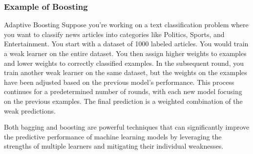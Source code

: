\documentclass[12pt]{article}
\begin{document}
\subsubsection{Example of Boosting}
Adaptive Boosting
Suppose you're working on a text classification problem where you want to classify news articles into categories like Politics, Sports, and Entertainment. You start with a dataset of 1000 labeled articles. You would train a weak learner on the entire dataset. You then assign higher weights to examples and lower weights to correctly classified examples.
In the subsequent round, you train another weak learner on the same dataset, but the weights on the examples have been adjusted based on the previous model's performance. This process continues for a predetermined number of rounds, with each new model focusing on the previous examples. The final prediction is a weighted combination of the weak predictions.

Both bagging and boosting are powerful techniques that can significantly improve the predictive performance of machine learning models by leveraging the strengths of multiple learners and mitigating their individual weaknesses.
\end{document}
